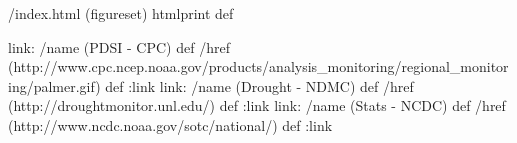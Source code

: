 /index.html {(figureset) htmlprint} def
\begin{ingrid}
link:
/name (PDSI - CPC) def
/href (http://www.cpc.ncep.noaa.gov/products/analysis_monitoring/regional_monitoring/palmer.gif) def
:link
link:
/name (Drought - NDMC) def
/href (http://droughtmonitor.unl.edu/) def
:link
link:
/name (Stats - NCDC) def
/href (http://www.ncdc.noaa.gov/sotc/national/) def
:link

\end{ingrid}

